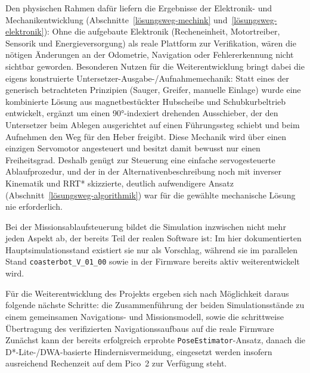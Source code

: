 Den physischen Rahmen dafür liefern die Ergebnisse der Elektronik- und Mechanikentwicklung (Abschnitte~\ref{lösungsweg-mechink} und~\ref{lösungsweg-elektronik}): Ohne die aufgebaute Elektronik (Recheneinheit, Motortreiber, Sensorik und Energieversorgung) als reale Plattform zur Verifikation, wären die nötigen Änderungen an der Odometrie, Navigation oder Fehlererkennung nicht sichtbar geworden. Besonderen Nutzen für die Weiterentwicklung bringt dabei die eigens konstruierte Untersetzer-Ausgabe-/Aufnahmemechanik: Statt eines der generisch betrachteten Prinzipien (Sauger, Greifer, manuelle Einlage) wurde eine kombinierte Lösung aus magnetbestückter Hubscheibe und Schubkurbeltrieb entwickelt, ergänzt um einen 90°-indexiert drehenden Ausschieber, der den Untersetzer beim Ablegen ausgerichtet auf einen Führungssteg schiebt und beim Aufnehmen den Weg für den Heber freigibt. Diese Mechanik wird über einen einzigen Servomotor angesteuert und besitzt damit bewusst nur einen Freiheitsgrad. Deshalb genügt zur Steuerung eine einfache servogesteuerte Ablaufprozedur, und der in der Alternativenbeschreibung noch mit inverser Kinematik und RRT* skizzierte, deutlich aufwendigere Ansatz (Abschnitt~\ref{lösungsweg-algorithmik}) war für die gewählte mechanische Lösung nie erforderlich.

Bei der Missionsablaufsteuerung bildet die Simulation inzwischen nicht mehr jeden Aspekt ab, der bereits Teil der realen Software ist: Im hier dokumentierten Hauptsimulationsstand existiert sie nur als Vorschlag, während sie im parallelen Stand \texttt{coasterbot\_V\_01\_00} sowie in der Firmware bereits aktiv weiterentwickelt wird.

Für die Weiterentwicklung des Projekts ergeben sich nach Möglichkeit daraus folgende nächste Schritte: die Zusammenführung der beiden Simulationsstände zu einem gemeinsamen Navigations- und Missionsmodell, sowie die schrittweise Übertragung des verifizierten Navigationssaufbaus auf die reale Firmware Zunächst kann der bereits erfolgreich erprobte \texttt{PoseEstimator}-Ansatz, danach die D*-Lite-/DWA-basierte Hindernisvermeidung, eingesetzt werden insofern ausreichend Rechenzeit auf dem Pico~2 zur Verfügung steht.
